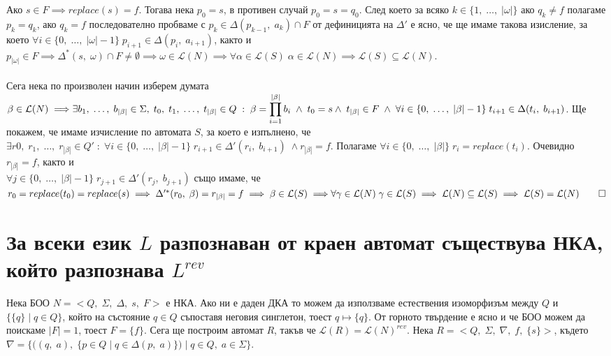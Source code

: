 \documentclass[a4paper, 12pt, oneside]{article}
\newcommand{\Lang}{\mathcal{L}}
\begin{document}
Ако $s \in F \implies replace(s) = f$. Тогава нека $p_0 = s$, в противен случай $p_0 = s = q_0$.
След което за всяко $k \in \{1, \; \dots, \; |\omega|\}$ ако $q_k \neq f$ полагаме $p_k = q_k$,
ако $q_k = f$ последователно пробваме с $p_k \in \Delta(p_{k - 1}, \; a_k) \cap F$ от дефиницията на $\Delta'$
е ясно, че ще имаме такова изисление, за което
$\forall i \in \{0, \; \dots, \; |\omega| - 1\} \; p_{i + 1} \in \Delta(p_i, \; a_{i + 1})$,
както и $p_{|\omega|} \in F \implies \Delta^*(s, \; \omega) \cap F \neq \emptyset
\implies \omega \in \Lang(N) \implies \forall \alpha \in \Lang(S) \; \alpha \in \Lang(N)
\implies \Lang(S) \subseteq \Lang(N)$. \\\\

Сега нека по произволен начин изберем думата $\beta \in \Lang(N) \implies \\\\
\exists b_1, \; \dots, \; b_{|\beta|} \in \Sigma, \; t_0, \; t_1, \; \dots, \; t_{|\beta|} \in Q \; : \;
\beta = \displaystyle\prod_{i = 1}^{|\beta|} b_i \; \land \; t_0 = s \\\\
\land \; t_{|\beta|} \in F \; \land \; \forall i \in \{0, \; \dots, \; |\beta| - 1\} \; t_{i + 1} \in \Delta(t_i, \; b_{i + 1})$.
Ще покажем, че имаме изчисление по автомата $S$, за което е изпълнено, че \\
$\exists r0, \; r_1, \; \dots, \; r_{|\beta|} \in Q' \; : \; \forall i \in \{0, \; \dots, \; |\beta| - 1\} \;
r_{i + 1} \in \Delta'(r_i, \; b_{i + 1}) \; \land r_{|\beta|} = f$.
Полагаме $\forall i \in \{0, \; \dots, \; |\beta|\}  \; r_i = replace(t_i)$. Очевидно $r_{|\beta|} = f$, както и \\
$\forall j \in \{0, \; \dots, \; |\beta| - 1\} \; r_{j + 1} \in \Delta'(r_j, \; b_{j + 1})$ също имаме, че \\
$r_0 = replace(t_0) = replace(s) \implies \Delta'^*(r_0, \; \beta) = r_{|\beta|} = f \implies \beta \in \Lang(S) \implies \\
\forall \gamma \in \Lang(N) \; \gamma \in \Lang(S) \implies
\Lang(N) \subseteq \Lang(S) \implies \Lang(S) = \Lang(N) \qed$

\section{За всеки език $L$ разпознаван от краен автомат съществува НКА, който разпознава $L^{rev}$}

Нека БОО $N = <Q, \; \Sigma, \; \Delta, \; s, \; F>$ е НКА. Ако ни е даден ДКА то можем да използваме
естествения изоморфизъм между $Q$ и $\{\{q\} \; | \; q \in Q\}$, който на състояние $q \in Q$ съпоставя
неговия синглетон, тоест $q \mapsto \{q\}$. От горното твърдение е ясно и че БОО можем да поискаме $|F| = 1$,
тоест $F = \{f\}$.
Сега ще построим автомат $R$, такъв че $\Lang(R) = \Lang(N)^{rev}$.
Нека $R = <Q, \; \Sigma, \; \nabla, \; f, \; \{s\}>$, където
$\nabla = \{((q, \; a), \; \{p \in Q \; | \; q \in \Delta(p, \; a)\}) \; | \; q \in Q, \; a \in \Sigma \}$. \\\\
\end{document}
